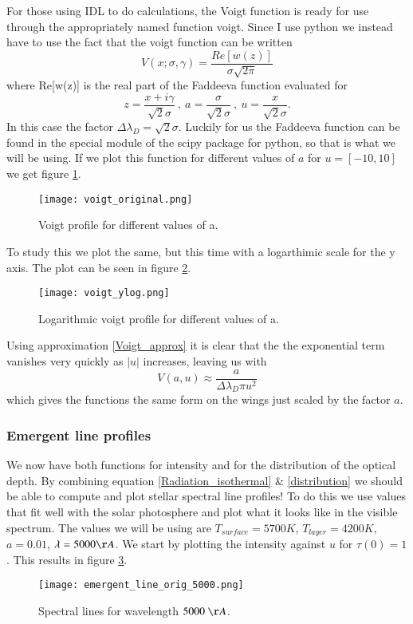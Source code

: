 \documentclass{aa}   %
\begin{document}
For those using IDL to do calculations, the Voigt function is ready for use through the appropriately named function voigt.
Since I use python we instead have to use the fact that the voigt function can be written
\begin{equation}
 V(x;\sigma,\gamma) = \frac{Re[w(z)]}{\sigma \sqrt{2\pi}}
\end{equation}
where Re[w(z)] is the real part of the Faddeeva function evaluated for 
\[
 z = \frac{x + i\gamma}{\sqrt{2}\sigma} ~,~ a = \frac{\sigma}{\sqrt{2}\sigma} ~,~ u = \frac{x}{\sqrt{2}\sigma}.
\]
In this case the factor $\Delta\lambda_D = \sqrt{2}\sigma$.
Luckily for us the Faddeeva function can be found in the special module of the scipy package for python, so that is what we will be using. If we plot this function for different values of $a$ for $u = [-10, 10]$ we get figure \ref{voigt_orig}.
\begin{figure}
\texttt{[image: voigt\_original.png]}
\caption{Voigt profile for different values of a.}
\label{voigt_orig}
\end{figure}
To study this we plot the same, but this time with a logarthimic scale for the y axis. The plot can be seen in figure \ref{voigt_ylog}.
\begin{figure}
\texttt{[image: voigt\_ylog.png]}
\caption{Logarithmic voigt profile for different values of a.}
\label{voigt_ylog}
\end{figure}
Using approximation \ref{Voigt_approx} it is clear that the the exponential term vanishes very quickly as $|u|$ increases, leaving us with
\[
 V(a,u) \approx \frac{a}{\Delta\lambda_D\pi u^2} 
\]
which gives the functions the same form on the wings just scaled by the factor $a$.

\subsubsection{Emergent line profiles}
We now have both functions for intensity and for the distribution of the optical depth. By combining equation \ref{Radiation_isothermal} \& \ref{distribution} we should be able to compute and plot stellar spectral line profiles!
To do this we use values that fit well with the solar photosphere and plot what it looks like in the visible spectrum.
The values we will be using are $T_{surface} = 5700 K$, $T_{layer} = 4200 K$, $a = 0.01$, $\lambda = 5000 \AA$.
We start by plotting the intensity against $u$ for $\tau(0) = 1$. This results in figure \ref{emergent_line_orig_5000}.
\begin{figure}
 \texttt{[image: emergent\_line\_orig\_5000.png]}
 \caption{Spectral lines for wavelength $5000 ~\AA$.}
 \label{emergent_line_orig_5000}
\end{figure}
\end{document}
